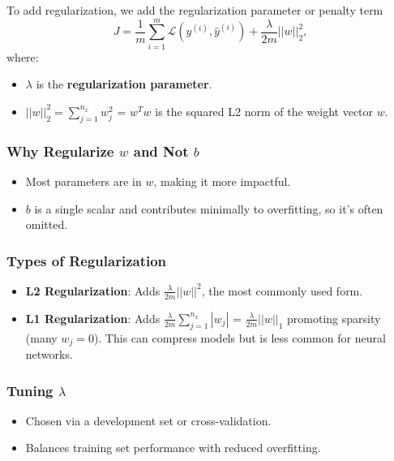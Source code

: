 \documentclass[letterpaper,12pt,notitlepage,twoside]{report}
\begin{document}
To add regularization, we add the regularization parameter or penalty term
    \[
    J = \frac{1}{m} \sum_{i=1}^m \mathcal{L} (y^{(i)}, \hat{y}^{(i)}) + \frac{\lambda}{2m} ||w||_2^2,
    \]
    where:
    \begin{itemize}
        \item \( \lambda \) is the \textbf{regularization parameter}.
        \item \( ||w||_2^2 = \sum_{j=1}^{n_x} w_j^2 \) = \( w^Tw \) is the squared L2 norm of the weight vector \( w \).
    \end{itemize}

\subsubsection{Why Regularize \( w \) and Not \( b \)}
\begin{itemize}
    \item Most parameters are in \( w \), making it more impactful.
    \item \( b \) is a single scalar and contributes minimally to overfitting, so it's often omitted.
\end{itemize}

\subsubsection{Types of Regularization}
\begin{itemize}
    \item \textbf{L2 Regularization}: Adds \( \frac{\lambda}{2m} ||w||^2 \), the most commonly used form.
    \item \textbf{L1 Regularization}: Adds \( \frac{\lambda}{2m} \sum_{j=1}^{n_x} |w_j| \) = \( \frac{\lambda}{2m} ||w||_1 \)  promoting sparsity (many \( w_j = 0 \)). This can compress models but is less common for neural networks.
\end{itemize}

\subsubsection{Tuning \( \lambda \)} 
\begin{itemize}
    \item Chosen via a development set or cross-validation.
    \item Balances training set performance with reduced overfitting.
\end{itemize}

\end{document}
